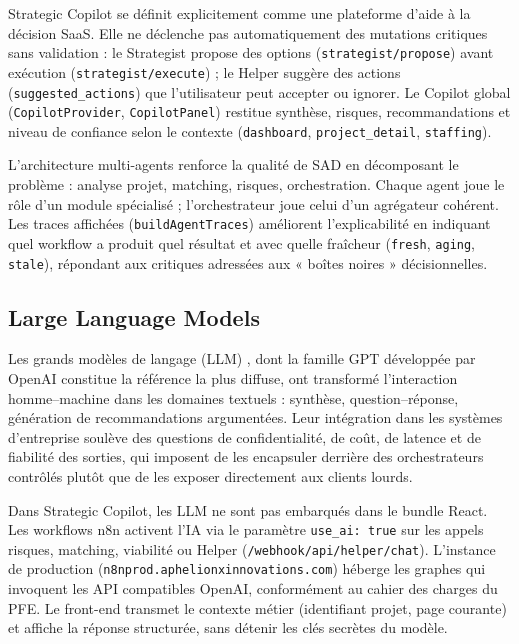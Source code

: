 Strategic Copilot se définit explicitement comme une plateforme d'aide à la décision SaaS. Elle ne déclenche pas automatiquement des mutations critiques sans validation : le Strategist propose des options (\texttt{strategist/propose}) avant exécution (\texttt{strategist/execute}) ; le Helper suggère des actions (\texttt{suggested\_actions}) que l'utilisateur peut accepter ou ignorer. Le Copilot global (\texttt{CopilotProvider}, \texttt{CopilotPanel}) restitue synthèse, risques, recommandations et niveau de confiance selon le contexte (\texttt{dashboard}, \texttt{project\_detail}, \texttt{staffing}).

L'architecture multi-agents renforce la qualité de SAD en décomposant le problème : analyse projet, matching, risques, orchestration. Chaque agent joue le rôle d'un module spécialisé ; l'orchestrateur joue celui d'un agrégateur cohérent. Les traces affichées (\texttt{buildAgentTraces}) améliorent l'explicabilité en indiquant quel workflow a produit quel résultat et avec quelle fraîcheur (\texttt{fresh}, \texttt{aging}, \texttt{stale}), répondant aux critiques adressées aux « boîtes noires » décisionnelles.

\subsection{Large Language Models}

Les grands modèles de langage (LLM) \cite{brown2020,russell2021}, dont la famille GPT développée par OpenAI \cite{openai2025} constitue la référence la plus diffuse, ont transformé l'interaction homme--machine dans les domaines textuels : synthèse, question--réponse, génération de recommandations argumentées. Leur intégration dans les systèmes d'entreprise soulève des questions de confidentialité, de coût, de latence et de fiabilité des sorties, qui imposent de les encapsuler derrière des orchestrateurs contrôlés plutôt que de les exposer directement aux clients lourds.

Dans Strategic Copilot, les LLM ne sont pas embarqués dans le bundle React. Les workflows n8n activent l'IA via le paramètre \texttt{use\_ai: true} sur les appels risques, matching, viabilité ou Helper (\texttt{/webhook/api/helper/chat}). L'instance de production (\texttt{n8nprod.aphelionxinnovations.com}) héberge les graphes qui invoquent les API compatibles OpenAI, conformément au cahier des charges du PFE. Le front-end transmet le contexte métier (identifiant projet, page courante) et affiche la réponse structurée, sans détenir les clés secrètes du modèle.

